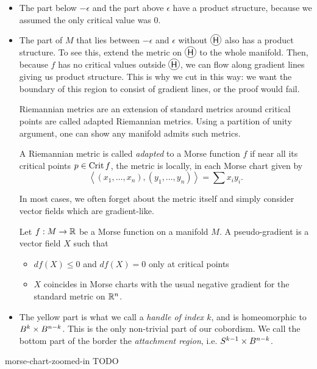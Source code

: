 \begin{itemize}
    \item[\circled{A}] The part below $-\epsilon$ and the part above $\epsilon$ have a product structure, because we assumed the only critical value was $0$.
    \item[\circled{B}] The part of $M$ that lies between $-\epsilon$  and $\epsilon$ without $\circled{H}$ also has a product structure.
        To see this, extend the metric on $\circled{H}$ to the whole manifold. Then, because $f$ has no critical values outside $\circled{H}$, we can flow along gradient lines giving us product structure.
        This is why we cut in this way: we want the boundary of this region to consist of gradient lines, or the proof would fail.

        Riemannian metrics are an extension of standard metrics around critical points are called adapted Riemannian metrics.
        Using a partition of unity argument, one can show any manifold admits such metrics.
        \begin{definition}
            A Riemannian  metric is called \emph{adapted} to a Morse function $f$ if near all its critical points $p \in \operatorname{Crit} f$, the metric is locally, in each Morse chart given by
            \[
            \left<
            (x_1, \ldots, x_n), 
            (y_1, \ldots, y_n)
            \right> = \sum x_i y_i
            .\] 
        \end{definition}
        In most cases, we often forget about the metric itself and simply consider vector fields which are gradient-like.

        \begin{definition}
            Let $f: M \to  \mathbb{R}$ be a Morse function on a manifold $M$. A pseudo-gradient is a vector field $X$ such that
            \begin{itemize}
                \item $df(X) \le 0$ and $df(X) = 0$ only at critical points
                \item $X$ coincides in Morse charts with the usual negative gradient for the standard metric on $\mathbb{R}^{n}$.
            \end{itemize}
        \end{definition}




    \item[\circled{H}]  The yellow part is what we call a \emph{handle of index $k$}, and is homeomorphic to $B^{k} \times B^{n-k}$.
        This is the only non-trivial part of our cobordism.
        We call the bottom part of the border the \emph{attachment region}, i.e. $S^{k-1} \times B^{n-k}$.
\end{itemize}
\begin{marginfigure}
    \centering
    \caption{morse-chart-zoomed-in TODO}
    \label{fig:morse-chart-zoomed-in}
\end{marginfigure}






